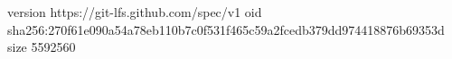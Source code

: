 version https://git-lfs.github.com/spec/v1
oid sha256:270f61e090a54a78eb110b7c0f531f465c59a2fcedb379dd974418876b69353d
size 5592560
